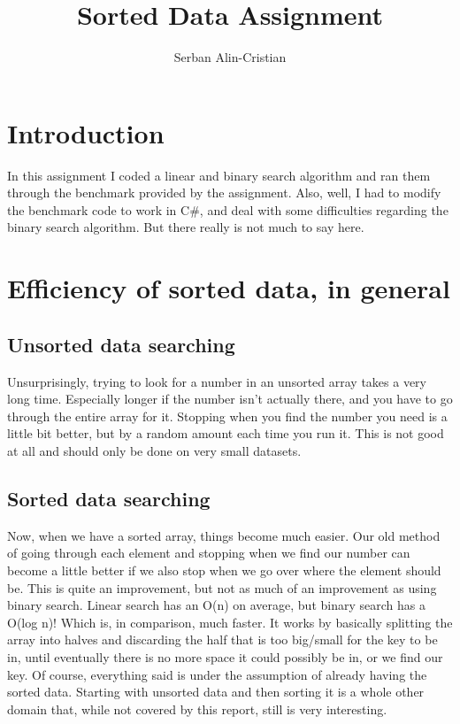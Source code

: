 \documentclass{article}
\title{Sorted Data Assignment}
\author{Serban Alin-Cristian}
\begin{document}
\maketitle



\section{Introduction}

In this assignment I coded a linear and binary search algorithm and ran them through the benchmark provided by the assignment. Also, well, I had to modify the benchmark code to work in C#, and deal with some difficulties regarding the binary search algorithm. But there really is not much to say here.

\section{Efficiency of sorted data, in general}

\subsection{Unsorted data searching}

Unsurprisingly, trying to look for a number in an unsorted array takes a very long time. Especially longer if the number isn't actually there, and you have to go through the entire array for it. Stopping when you find the number you need is a little bit better, but by a random amount each time you run it. This is not good at all and should only be done on very small datasets.

\subsection{Sorted data searching}

Now, when we have a sorted array, things become much easier. Our old method of going through each element and stopping when we find our number can become a little better if we also stop when we go over where the element should be.
This is quite an improvement, but not as much of an improvement as using binary search. Linear search has an O(n) on average, but binary search has a O(log n)! Which is, in comparison, much faster. It works by basically splitting the array into halves and discarding the half that is too big/small for the key to be in, until eventually there is no more space it could possibly be in, or we find our key.
Of course, everything said is under the assumption of already having the sorted data. Starting with unsorted data and then sorting it is a whole other domain that, while not covered by this report, still is very interesting.
\end{document}
